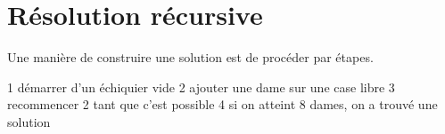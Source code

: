 \section*{Résolution récursive}

Une manière de construire une solution est de procéder par étapes.

1 démarrer d'un échiquier vide
2 ajouter une dame sur une case libre
3 recommencer 2 tant que c'est possible
4 si on atteint 8 dames, on a trouvé une solution



